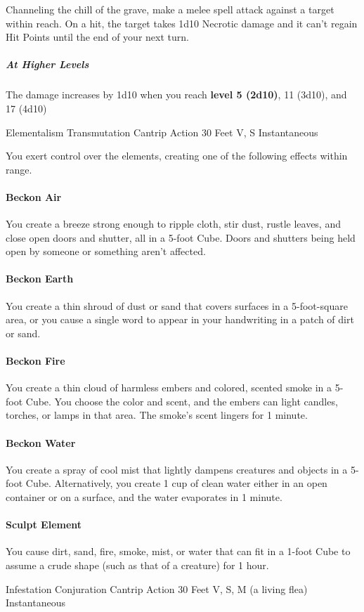 \documentclass[letterpaper,openany,oneside,twocolumn]{book}
\begin{document}
Channeling the chill of the grave, make a melee spell attack against a target within reach. On a hit, the target takes 1d10 Necrotic damage and it can't regain Hit Points until the end of your next turn.

\subparagraph*{At Higher Levels} The damage increases by 1d10 when you reach \textbf{level 5 (2d10)}, 11 (3d10), and 17 (4d10)

\DndSpellHeader
  {Elementalism}
  {Transmutation Cantrip}
  {Action}
  {30 Feet}
  {V, S}
  {Instantaneous}

You exert control over the elements, creating one of the following effects within range.
\paragraph*{Beckon Air} You create a breeze strong enough to ripple cloth, stir dust, rustle leaves, and close open doors and shutter, all in a 5-foot Cube. Doors and shutters being held open by someone or something aren't affected.
\paragraph*{Beckon Earth} You create a thin shroud of dust or sand that covers surfaces in a 5-foot-square area, or you cause a single word to appear in your handwriting in a patch of dirt or sand.
\paragraph*{Beckon Fire} You create a thin cloud of harmless embers and colored, scented smoke in a 5-foot Cube. You choose the color and scent, and the embers can light candles, torches, or lamps in that area. The smoke's scent lingers for 1 minute.
\paragraph*{Beckon Water} You create a spray of cool mist that lightly dampens creatures and objects in a 5-foot Cube. Alternatively, you create 1 cup of clean water either in an open container or on a surface, and the water evaporates in 1 minute.
\paragraph*{Sculpt Element} You cause dirt, sand, fire, smoke, mist, or water that can fit in a 1-foot Cube to assume a crude shape (such as that of a creature) for 1 hour.

\DndSpellHeader
  {Infestation}
  {Conjuration Cantrip}
  {Action}
  {30 Feet}
  {V, S, M (a living flea)}
  {Instantaneous}
\end{document}

